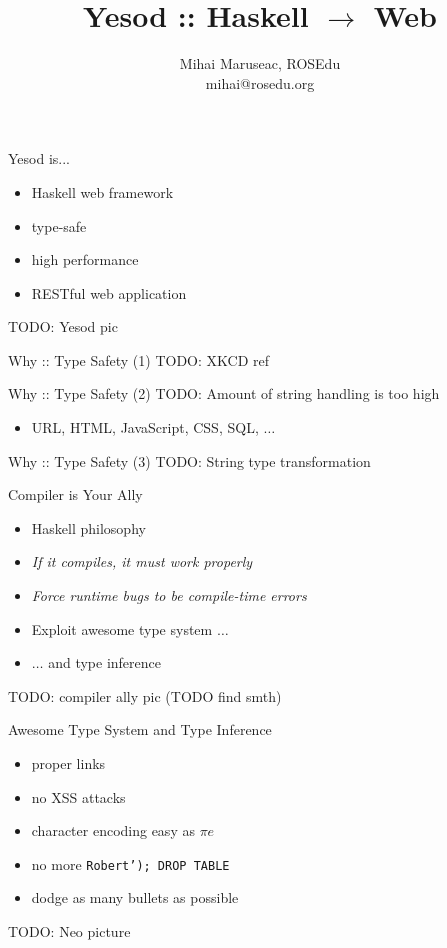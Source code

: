 \documentclass{beamer}
\title{Yesod :: Haskell $\rightarrow$ Web}
\author{Mihai Maruseac, ROSEdu\\mihai@rosedu.org}
\begin{document}
\maketitle

\begin{frame}{Yesod is...}
  \begin{itemize}[<+->]
    \item Haskell web framework
    \item type-safe
    \item high performance
    \item RESTful web application
  \end{itemize}
  TODO: Yesod pic
\end{frame}

\begin{frame}{Why :: Type Safety (1)}
  TODO: XKCD ref
\end{frame}

\begin{frame}{Why :: Type Safety (2)}
  TODO: Amount of string handling is too high
  \begin{itemize}
    \item URL, HTML, JavaScript, CSS, SQL, $\ldots$
  \end{itemize}
\end{frame}

\begin{frame}{Why :: Type Safety (3)}
  TODO: String type transformation
\end{frame}

\begin{frame}{Compiler is Your Ally}
  \begin{itemize}[<+->]
    \item Haskell philosophy
    \item \textit{If it compiles, it must work properly}
    \item \textit{Force runtime bugs to be compile-time errors}
    \item Exploit awesome type system $\ldots$
    \item $\ldots$ and type inference
  \end{itemize}
  TODO: compiler ally pic (TODO find smth)
\end{frame}

\begin{frame}{Awesome Type System and Type Inference}
  \begin{itemize}[<+->]
    \item proper links
    \item no XSS attacks
    \item character encoding easy as $\pi e$
    \item no more \texttt{Robert'); DROP TABLE}
    \item dodge as many bullets as possible
  \end{itemize}
  TODO: Neo picture
\end{frame}
\end{document}
